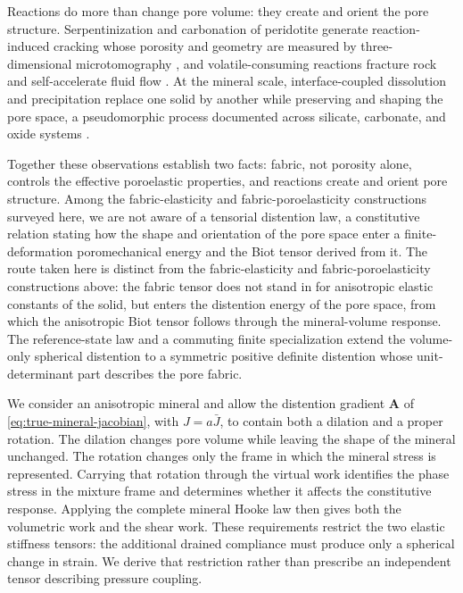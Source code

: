 \documentclass[11pt]{article}
\begin{document}
Reactions do more than change pore volume: they create and orient the pore
structure. Serpentinization and carbonation of peridotite generate
reaction-induced cracking whose porosity and geometry are measured by
three-dimensional microtomography \citep{rudgekelemen2010,jons2017}, and
volatile-consuming reactions fracture rock and self-accelerate fluid flow
\citep{uno2022}. At the mineral scale, interface-coupled dissolution and
precipitation replace one solid by another while preserving and shaping
the pore space, a pseudomorphic process documented across silicate,
carbonate, and oxide systems
\citep{putnis2002,putnis2009,ruizagudo2014,geisler2007,altreewilliams2015}.

Together these observations establish two facts: fabric, not porosity
alone, controls the effective poroelastic properties, and reactions create
and orient pore structure. Among the fabric-elasticity and
fabric-poroelasticity constructions surveyed here, we are not aware of a
tensorial distention law, a constitutive relation stating how the shape and
orientation of the pore space enter a finite-deformation poromechanical
energy and the Biot tensor derived from it. The route taken here is
distinct from the fabric-elasticity and fabric-poroelasticity constructions
above: the fabric tensor does not stand in for anisotropic elastic
constants of the solid, but enters the distention energy of the pore space,
from which the anisotropic Biot tensor follows through the mineral-volume
response. The reference-state law and a commuting finite specialization
extend the volume-only spherical distention to a symmetric positive
definite distention whose unit-determinant part describes the pore fabric.

We consider an anisotropic mineral and allow the distention gradient
\(\mathbf A\) of \eqref{eq:true-mineral-jacobian}, with \(J=a\bar J\), to
contain both a dilation and a proper rotation. The dilation changes pore
volume while leaving the shape of the mineral unchanged. The rotation
changes only the frame in which the mineral stress is represented.
Carrying that rotation through the virtual work identifies the phase
stress in the mixture frame and determines whether it affects the
constitutive response. Applying the complete mineral Hooke law then gives both the
volumetric work and the shear work. These requirements restrict the two
elastic stiffness tensors: the additional drained compliance must produce
only a spherical change in strain. We derive that restriction rather than prescribe
an independent tensor describing pressure coupling.
\end{document}
